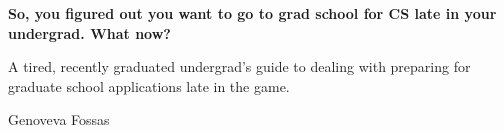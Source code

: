 \begin{titlepage}
    \begin{center}
        \vspace*{1cm}

        \Huge
        \textbf{So, you figured out you want to go to grad school 
                for CS late in your undergrad. What now?}
 
        \large
        \vspace{0.5cm}

        A tired, recently graduated undergrad’s guide to dealing
        with preparing for graduate school applications late in the game.
             
        \vspace{1.5cm}

        \vfill

        \small
        Genoveva Fossas
             
    \end{center}
 \end{titlepage}
